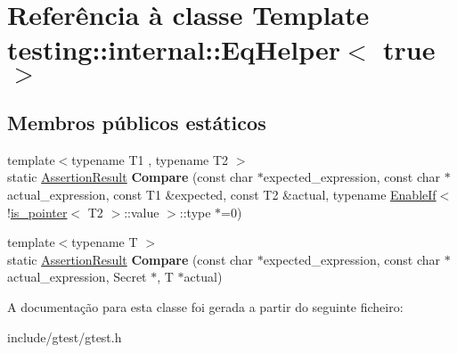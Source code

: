 \hypertarget{classtesting_1_1internal_1_1EqHelper_3_01true_01_4}{\section{Referência à classe Template testing\-:\-:internal\-:\-:Eq\-Helper$<$ true $>$}
\label{classtesting_1_1internal_1_1EqHelper_3_01true_01_4}
}
\subsection*{Membros públicos estáticos}
\begin{DoxyCompactItemize}
\item 
\hypertarget{classtesting_1_1internal_1_1EqHelper_3_01true_01_4_a70d6d7e3cb1df06ad6114f25e843fd6d}{{\footnotesize template$<$typename T1 , typename T2 $>$ }\\static \hyperlink{classtesting_1_1AssertionResult}{Assertion\-Result} {\bfseries Compare} (const char $\ast$expected\-\_\-expression, const char $\ast$actual\-\_\-expression, const T1 \&expected, const T2 \&actual, typename \hyperlink{structtesting_1_1internal_1_1EnableIf}{Enable\-If}$<$!\hyperlink{structtesting_1_1internal_1_1is__pointer}{is\-\_\-pointer}$<$ T2 $>$\-::value $>$\-::type $\ast$=0)}\label{classtesting_1_1internal_1_1EqHelper_3_01true_01_4_a70d6d7e3cb1df06ad6114f25e843fd6d}

\item 
\hypertarget{classtesting_1_1internal_1_1EqHelper_3_01true_01_4_ab38e840297adb48f18767a1a99187fb3}{{\footnotesize template$<$typename T $>$ }\\static \hyperlink{classtesting_1_1AssertionResult}{Assertion\-Result} {\bfseries Compare} (const char $\ast$expected\-\_\-expression, const char $\ast$actual\-\_\-expression, Secret $\ast$, T $\ast$actual)}\label{classtesting_1_1internal_1_1EqHelper_3_01true_01_4_ab38e840297adb48f18767a1a99187fb3}

\end{DoxyCompactItemize}


A documentação para esta classe foi gerada a partir do seguinte ficheiro\-:\begin{DoxyCompactItemize}
\item 
include/gtest/gtest.\-h\end{DoxyCompactItemize}
